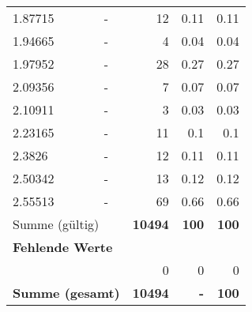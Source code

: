 \begin{longtable}{lXrrr}
        1.87715 & \multicolumn{1}{X}{-} & %
          \num{12} &
          \num[round-mode=places,round-precision=2]{0.11} &
          \num[round-mode=places,round-precision=2]{0.11} \\

        1.94665 & \multicolumn{1}{X}{-} & %
          \num{4} &
          \num[round-mode=places,round-precision=2]{0.04} &
          \num[round-mode=places,round-precision=2]{0.04} \\

        1.97952 & \multicolumn{1}{X}{-} & %
          \num{28} &
          \num[round-mode=places,round-precision=2]{0.27} &
          \num[round-mode=places,round-precision=2]{0.27} \\

        2.09356 & \multicolumn{1}{X}{-} & %
          \num{7} &
          \num[round-mode=places,round-precision=2]{0.07} &
          \num[round-mode=places,round-precision=2]{0.07} \\

        2.10911 & \multicolumn{1}{X}{-} & %
          \num{3} &
          \num[round-mode=places,round-precision=2]{0.03} &
          \num[round-mode=places,round-precision=2]{0.03} \\

        2.23165 & \multicolumn{1}{X}{-} & %
          \num{11} &
          \num[round-mode=places,round-precision=2]{0.1} &
          \num[round-mode=places,round-precision=2]{0.1} \\

        2.3826 & \multicolumn{1}{X}{-} & %
          \num{12} &
          \num[round-mode=places,round-precision=2]{0.11} &
          \num[round-mode=places,round-precision=2]{0.11} \\

        2.50342 & \multicolumn{1}{X}{-} & %
          \num{13} &
          \num[round-mode=places,round-precision=2]{0.12} &
          \num[round-mode=places,round-precision=2]{0.12} \\

        2.55513 & \multicolumn{1}{X}{-} & %
          \num{69} &
          \num[round-mode=places,round-precision=2]{0.66} &
          \num[round-mode=places,round-precision=2]{0.66} \\

     \midrule
     \multicolumn{2}{l}{Summe (gültig)} &
       \textbf{\num{10494}} &
     \textbf{\num{100}} &
       \textbf{\num[round-mode=places,round-precision=2]{100}} \\
     \multicolumn{5}{l}{\textbf{Fehlende Werte}}\\
      & & 0 & 0 & 0 \\
     \midrule
     \multicolumn{2}{l}{\textbf{Summe (gesamt)}} &
          \textbf{\num{10494}} &
        \textbf{-} &
        \textbf{\num{100}} \\
     \bottomrule
     \end{longtable}
     
